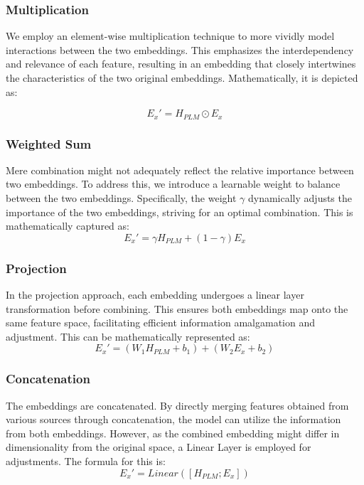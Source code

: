 \documentclass[conference]{IEEEtran}
\begin{document}
\subsubsection{Multiplication}
We employ an element-wise multiplication technique to more vividly model interactions between the two embeddings. This emphasizes the interdependency and relevance of each feature, resulting in an embedding that closely intertwines the characteristics of the two original embeddings. Mathematically, it is depicted as:

\begin{equation}
E_x' =  H_{PLM} \odot E_x
\end{equation}

\subsubsection{Weighted Sum}
Mere combination might not adequately reflect the relative importance between two embeddings. To address this, we introduce a learnable weight to balance between the two embeddings. Specifically, the weight \(\gamma\) dynamically adjusts the importance of the two embeddings, striving for an optimal combination. This is mathematically captured as:
\begin{equation}
E_x' = \gamma H_{PLM} + (1 - \gamma) E_x
\end{equation}

\subsubsection{Projection}
In the projection approach, each embedding undergoes a linear layer transformation before combining. This ensures both embeddings map onto the same feature space, facilitating efficient information amalgamation and adjustment. This can be mathematically represented as:
\begin{equation}
E_x' = (W_1 H_{PLM} + b_1) + (W_2 E_x + b_2)
\end{equation}

\subsubsection{Concatenation}
The embeddings are concatenated. By directly merging features obtained from various sources through concatenation, the model can utilize the information from both embeddings. However, as the combined embedding might differ in dimensionality from the original space, a Linear Layer is employed for adjustments. The formula for this is:
\begin{equation}
E_x' = Linear([H_{PLM};E_x])
\end{equation}
\end{document}
